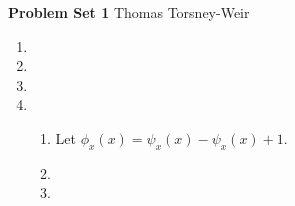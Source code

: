\documentclass[10pt]{article}
\begin{document}
{\bf Problem Set 1} \hfill {\raggedleft Thomas Torsney-Weir}

\begin{enumerate}
\item %

\item %

\item %

\item %
  \begin{enumerate}
    \item %
      Let $\phi_x(x) = \psi_x(x) - \psi_x(x) + 1$.
    
    \item %
      
    \item %

  \end{enumerate}

\end{enumerate}
\end{document}
